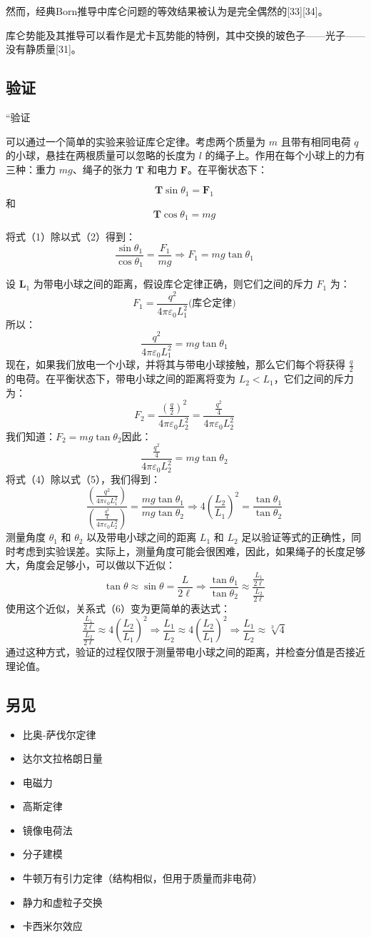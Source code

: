 然而，经典Born推导中库仑问题的等效结果被认为是完全偶然的[33][34]。

库仑势能及其推导可以看作是尤卡瓦势能的特例，其中交换的玻色子——光子——没有静质量[31]。
\subsection{验证}
“验证

可以通过一个简单的实验来验证库仑定律。考虑两个质量为 \( m \) 且带有相同电荷 \( q \) 的小球，悬挂在两根质量可以忽略的长度为 \( l \) 的绳子上。作用在每个小球上的力有三种：重力 \( mg \)、绳子的张力 \( \mathbf{T} \) 和电力 \( \mathbf{F} \)。在平衡状态下：

\[
\mathbf{T} \sin \theta_1 = \mathbf{F}_1 \tag{1}~
\]
和
\[
\mathbf{T} \cos \theta_1 = mg \tag{2}~
\]

将式（1）除以式（2）得到：
\[
\frac{\sin \theta_1}{\cos \theta_1} = \frac{F_1}{mg} \Rightarrow F_1 = mg \tan \theta_1 \tag{3}~
\]

设 \( \mathbf{L}_1 \) 为带电小球之间的距离，假设库仑定律正确，则它们之间的斥力 \( F_1 \) 为：
\[
F_1 = \frac{q^2}{4 \pi \varepsilon_0 L_1^2}\text{(库仑定律)}~ 
\]
所以：
\[
\frac{q^2}{4\pi \varepsilon_0 L_1^2} = mg \tan \theta_1 \tag{4}~
\]
现在，如果我们放电一个小球，并将其与带电小球接触，那么它们每个将获得 \( \frac{q}{2} \) 的电荷。在平衡状态下，带电小球之间的距离将变为 \( L_2 < L_1 \)，它们之间的斥力为：
\[
F_2 = \frac{\left( \frac{q}{2} \right)^2}{4 \pi \varepsilon_0 L_2^2} = \frac{\frac{q^2}{4}}{4 \pi \varepsilon_0 L_2^2} \tag{5}~
\]
我们知道：\(F_2 = mg \tan \theta_2\)因此：
\[
\frac{\frac{q^2}{4}}{4 \pi \varepsilon_0 L_2^2} = mg \tan \theta_2~
\]
将式（4）除以式（5），我们得到：
\[
\frac{\left( \frac{q^2}{4 \pi \varepsilon_0 L_1^2} \right)}{\left( \frac{\frac{q^2}{4}}{4 \pi \varepsilon_0 L_2^2} \right)} = \frac{mg \tan \theta_1}{mg \tan \theta_2} \Rightarrow 4 \left( \frac{L_2}{L_1} \right)^2 = \frac{\tan \theta_1}{\tan \theta_2} \tag{6}~
\] 
测量角度 \( \theta_1 \) 和 \( \theta_2 \) 以及带电小球之间的距离 \( L_1 \) 和 \( L_2 \) 足以验证等式的正确性，同时考虑到实验误差。实际上，测量角度可能会很困难，因此，如果绳子的长度足够大，角度会足够小，可以做以下近似：
\[
\tan \theta \approx \sin \theta = \frac{L}{2\ell} \Rightarrow \frac{\tan \theta_1}{\tan \theta_2} \approx \frac{\frac{L_1}{2\ell}}{\frac{L_2}{2\ell}} \tag{7}~
\]
使用这个近似，关系式（6）变为更简单的表达式：
\[
\frac{\frac{L_1}{2\ell}}{\frac{L_2}{2\ell}} \approx 4 \left( \frac{L_2}{L_1} \right)^2 \Rightarrow \frac{L_1}{L_2} \approx 4 \left( \frac{L_2}{L_1} \right)^2 \Rightarrow \frac{L_1}{L_2} \approx \sqrt[3]{4} \tag{8}~
\]
通过这种方式，验证的过程仅限于测量带电小球之间的距离，并检查分值是否接近理论值。 
\subsection{另见}
\begin{itemize}
\item 比奥-萨伐尔定律
\item 达尔文拉格朗日量
\item 电磁力
\item 高斯定律
\item 镜像电荷法
\item 分子建模
\item 牛顿万有引力定律（结构相似，但用于质量而非电荷）
\item 静力和虚粒子交换
\item 卡西米尔效应
\end{itemize}